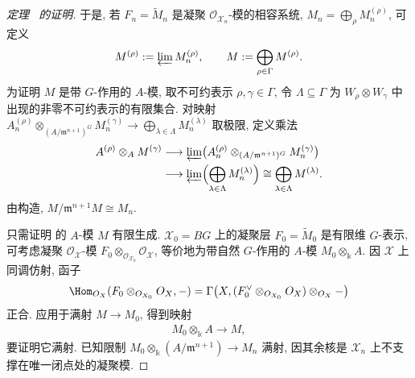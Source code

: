 \begin{proof}[定理~ 的证明]
于是, 若 $F_n=\widetilde M_n$ 是凝聚 $\mathcal O_{\mathcal X_n}$-模的相容系统, $M_n=\bigoplus_\rho M_n^{(\rho)}$, 可定义
\begin{align}\label{src:7.6.22}
M^{(\rho)}:=\varprojlim M_n^{(\rho)},\qquad M:=\bigoplus_{\rho\in\Gamma}M^{(\rho)}.
\end{align}
为证明 $M$ 是带 $G$-作用的 $A$-模, 取不可约表示 $\rho,\gamma\in\Gamma$, 令 $\Lambda\subseteq\Gamma$ 为 $W_\rho\otimes W_\gamma$ 中出现的非零不可约表示的有限集合. 对映射 $A_n^{(\rho)}\otimes_{(A/\mathfrak m^{n+1})^G}M_n^{(\gamma)}\to\bigoplus_{\lambda\in\Lambda}M_n^{(\lambda)}$ 取极限, 定义乘法
\begin{align*}
A^{(\rho)}\otimes_AM^{(\gamma)}&\longrightarrow\varprojlim\bigl(A_n^{(\rho)}\otimes_{(A/\mathfrak m^{n+1})^G}M_n^{(\gamma)}\bigr)\\
&\longrightarrow\varprojlim\Bigl(\bigoplus_{\lambda\in\Lambda}M_n^{(\lambda)}\Bigr)\cong\bigoplus_{\lambda\in\Lambda}M^{(\lambda)}.
\end{align*}
由构造, $M/\mathfrak m^{n+1}M\cong M_n$.

只需证明  的 $A$-模 $M$ 有限生成. $\mathcal X_0=BG$ 上的凝聚层 $F_0=\widetilde M_0$ 是有限维 $G$-表示, 可考虑凝聚 $\mathcal O_{\mathcal X}$-模 $F_0\otimes_{\mathcal O_{\mathcal X_0}}\mathcal O_{\mathcal X}$, 等价地为带自然 $G$-作用的 $A$-模 $M_0\otimes_{\Bbbk}A$. 因 $\mathcal X$ 上同调仿射, 函子
\begin{align*}
\Hom_{\mathcal O_{\mathcal X}}(F_0\otimes_{\mathcal O_{\mathcal X_0}}\mathcal O_{\mathcal X},-)
=\Gamma\bigl(\mathcal X,(F_0^\vee\otimes_{\mathcal O_{\mathcal X_0}}\mathcal O_{\mathcal X})\otimes_{\mathcal O_{\mathcal X}}-\bigr)
\end{align*}
正合. 应用于满射 $M\to M_0$, 得到映射
\begin{align}\label{src:7.6.23}
M_0\otimes_{\Bbbk}A\longrightarrow M,
\end{align}
要证明它满射. 已知限制 $M_0\otimes_{\Bbbk}(A/\mathfrak m^{n+1})\to M_n$ 满射, 因其余核是 $\mathcal X_n$ 上不支撑在唯一闭点处的凝聚模.


\end{proof}
